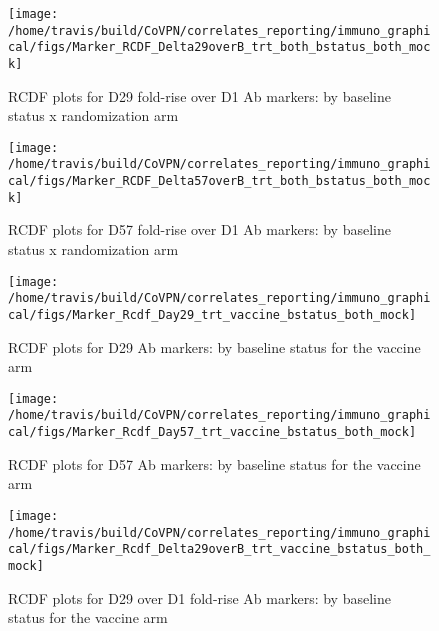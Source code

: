 \documentclass[]{book}
\theoremstyle{definition}
\theoremstyle{definition}
\theoremstyle{definition}
\newcommand{\1}{\mathbbm{1}}
\begin{document}
\clearpage
\begin{figure}[H]

{\centering \texttt{[image: /home/travis/build/CoVPN/correlates\_reporting/immuno\_graphical/figs/Marker\_RCDF\_Delta29overB\_trt\_both\_bstatus\_both\_mock]} 

}

\caption{RCDF plots for D29 fold-rise over D1 Ab markers: by baseline status x randomization arm}\label{fig:unnamed-chunk-23}
\end{figure}

\clearpage
\begin{figure}[H]

{\centering \texttt{[image: /home/travis/build/CoVPN/correlates\_reporting/immuno\_graphical/figs/Marker\_RCDF\_Delta57overB\_trt\_both\_bstatus\_both\_mock]} 

}

\caption{RCDF plots for D57 fold-rise over D1 Ab markers: by baseline status x randomization arm}\label{fig:unnamed-chunk-24}
\end{figure}

\clearpage
\begin{figure}[H]

{\centering \texttt{[image: /home/travis/build/CoVPN/correlates\_reporting/immuno\_graphical/figs/Marker\_Rcdf\_Day29\_trt\_vaccine\_bstatus\_both\_mock]} 

}

\caption{RCDF plots for D29 Ab markers: by baseline status for the vaccine arm}\label{fig:unnamed-chunk-25}
\end{figure}

\clearpage
\begin{figure}[H]

{\centering \texttt{[image: /home/travis/build/CoVPN/correlates\_reporting/immuno\_graphical/figs/Marker\_Rcdf\_Day57\_trt\_vaccine\_bstatus\_both\_mock]} 

}

\caption{RCDF plots for D57 Ab markers: by baseline status for the vaccine arm}\label{fig:unnamed-chunk-26}
\end{figure}

\clearpage
\begin{figure}[H]

{\centering \texttt{[image: /home/travis/build/CoVPN/correlates\_reporting/immuno\_graphical/figs/Marker\_Rcdf\_Delta29overB\_trt\_vaccine\_bstatus\_both\_mock]} 

}

\caption{RCDF plots for D29 over D1 fold-rise Ab markers: by baseline status for the vaccine arm}\label{fig:unnamed-chunk-27}
\end{figure}
\end{document}

